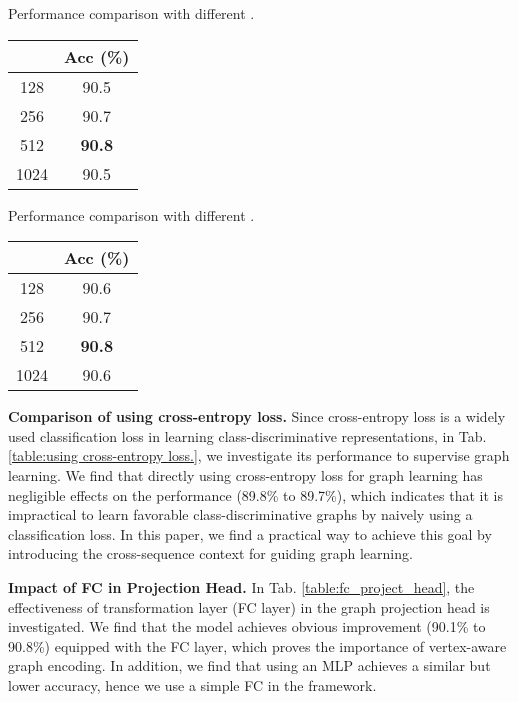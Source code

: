 \documentclass{article} \usepackage{iclr2023_conference,times}
\begin{document}
\begin{minipage}{\textwidth}
\begin{minipage}[t]{0.45\textwidth}
\centering
\makeatletter{}
\setlength\tabcolsep{2.5pt}
\scriptsize
\caption{Performance comparison with different .}
    \begin{tabular}{c||c}
\rowcolor{gray!30}  & Acc (\%) \\
       \hline \hline
        128 & 90.5 \\
        256 & 90.7 \\
        512 & \textbf{90.8} \\
        1024 & 90.5 \\ \hline
    \end{tabular}
    \label{tab:K_H_minus.}
\end{minipage}
\hspace{3mm}
\begin{minipage}[t]{0.45\textwidth}
\centering
\makeatletter{}
\setlength\tabcolsep{2.5pt}
\scriptsize
\caption{Performance comparison with different .}
    \begin{tabular}{c||c}
\rowcolor{gray!30}  & Acc (\%) \\
       \hline \hline
        128 & 90.6 \\
        256 & 90.7 \\
        512 & \textbf{90.8} \\
        1024 & 90.6 \\ \hline
    \end{tabular}
    \label{tab:K_R_minus.}
\end{minipage}
\end{minipage}


\textbf{Comparison of using cross-entropy loss.} Since cross-entropy loss is a widely used classification loss in learning class-discriminative representations, in Tab. \ref{table:using cross-entropy loss.}, we investigate its performance to supervise graph learning. We find that directly using cross-entropy loss for graph learning has negligible effects on the performance (89.8\% to 89.7\%), which indicates that it is impractical to learn favorable class-discriminative graphs by naively using a classification loss. In this paper, we find a practical way to achieve this goal by introducing the cross-sequence context for guiding graph learning.

\noindent \textbf{Impact of FC in Projection Head.} In Tab. \ref{table:fc_project_head}, the effectiveness of transformation layer (FC layer) in the graph projection head is investigated. We find that the model achieves obvious improvement (90.1\% to 90.8\%) equipped with the FC layer, which proves the importance of vertex-aware graph encoding. In addition, we find that using an MLP achieves a similar but lower accuracy, hence we use a simple FC in the framework.
\end{document}
